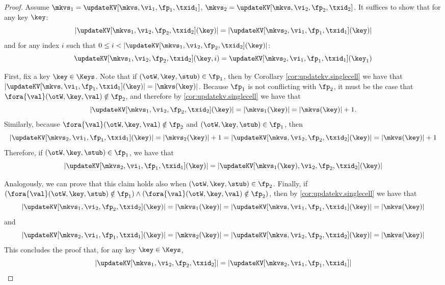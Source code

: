 \begin{proof}
Assume $\mkvs_1 = \updateKV[\mkvs, \vi_1, \fp_1, \txid_1]$, $\mkvs_2 = \updateKV[\mkvs, \vi_2, \fp_2, \txid_2]$. 
It suffices to show that for any key $\key$:
\[\lvert \updateKV[\mkvs_1, \vi_2, \fp_2, \txid_2](\key) \rvert = \lvert 
\updateKV[\mkvs_2, \vi_1, \fp_1, \txid_1](\key) \rvert
\]
and for any index $i$ such that \( 0 \leq i < \lvert \updateKV[\mkvs_1, \vi_2, \fp_2, \txid_2](\key) \rvert \):
\[
\updateKV[\mkvs_1, \vi_2,\fp_2, \txid_2](\key, i) = \updateKV[\mkvs_2, \vi_1, \fp_1, \txid_1](\key_1)
\]

First, fix a key $\key \in \Keys$. Note that if $(\otW, \key, \stub) \in \fp_1$, then 
by Corollary \ref{cor:updatekv.singlecell} we have that $\lvert \updateKV[\mkvs, \vi_1, \fp_1, \txid_1](\key) \rvert = 
\lvert \mkvs(\key) \rvert$. Because $\fp_1$ is not conflicting with $\fp_2$, it must be the case 
that $\fora{ \val } (\otW,\key,\val) \notin \fp_2$, and therefore by \cref{cor:updatekv.singlecell} 
we have that 
\[
\lvert \updateKV[\mkvs_1, \vi_2, \fp_2, \txid_2](\key) \rvert = \lvert \mkvs_1(\key) \rvert = \lvert \mkvs(\key) \rvert + 1.
\] 
Similarly, because $\fora{ \val } (\otW,\key,\val)\notin \fp_2$ 
and $(\otW,\key,\stub) \in \fp_1$, then 
\[
\lvert \updateKV[\mkvs_2, \vi_1, \fp_1, \txid_1](\key) \rvert = \lvert \mkvs_2(\key) \rvert + 1 
= \lvert \updateKV[\mkvs, \vi_2, \fp_2, \txid_2](\key) \rvert = \lvert \mkvs(\key) \rvert + 1
\]
Therefore, if $(\otW, \key, \stub) \in \fp_1$, we have that 
\[ 
\lvert \updateKV[\mkvs_2, \vi_1, \fp_1, \txid_1](\key) \rvert = 
\lvert \updateKV[\mkvs_1(\key), \vi_2, \fp_2, \txid_2](\key) \rvert
\]

Analogously, we can prove that this claim holds also when $(\otW, \key, \stub) \in \fp_2$. 
Finally, if $(\fora{ \val } (\otW,\key,\stub) \notin \fp_1) \land (\fora{ \val } (\otW,\key,\val) \notin \fp_2)$, 
then by \cref{cor:updatekv.singlecell} we have that 
\[
\lvert \updateKV[\mkvs_1, \vi_2, \fp_2, \txid_2](\key) \rvert = 
\lvert \mkvs_1(\key) \rvert = \lvert \updateKV[\mkvs, \vi_1, \fp_1, \txid_1](\key) \rvert = \lvert \mkvs(\key) \rvert
\]
and
\[
\lvert \updateKV[\mkvs_2, \vi_1, \fp_1, \txid_1](\key) \rvert = 
\lvert \mkvs_2(\key) \rvert = \lvert \updateKV[\mkvs, \vi_2, \fp_2, \txid_2](\key) \rvert = \lvert \mkvs(\key) \rvert
\]
This concludes the proof that, for any key $\key \in \Keys$,
\[ \lvert \updateKV[\mkvs_1,\vi_2,\fp_2,\txid_2] \rvert = 
\lvert \updateKV[\mkvs_2,\vi_1,\fp_1,\txid_1] \rvert
\]


\end{proof}
